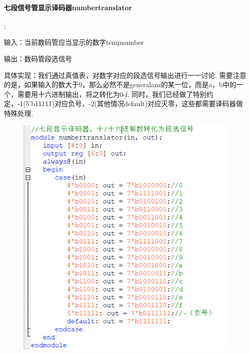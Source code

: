 \documentclass[UTF8]{ctexart}
\begin{document}
\paragraph{七段信号管显示译码器numbertranslator}:\par
输入：当前数码管应当显示的数字tempnumber\par
输出：数码管段选信号\par
具体实现：我们通过真值表，对数字对应的段选信号输出进行一一讨论. 需要注意的是，如果输入的数大于9，那么必然不是generalans的某一位，而是a，b中的一个，需要用十六进制输出，将之转化为0-f. 同时，我们已经做了特别约定，-1(5'b11111)对应负号，-2(其他情况default)对应灭零，这些都需要译码器做特殊处理.
\begin{figure}[H]\begin{center}
    \includegraphics[scale=1]{numbertranslator.PNG}
\end{center}\end{figure}
\end{document}
